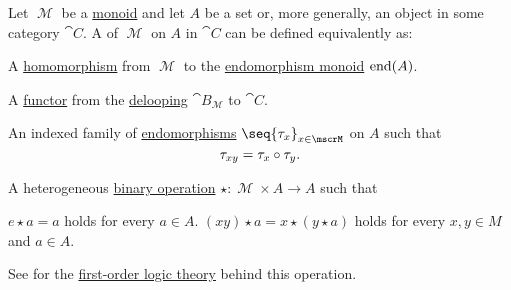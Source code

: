 \begin{definition}\label{def:left_monoid_action}
  Let \( \mscrM \) be a \hyperref[def:unital_magma/monoid]{monoid} and let \( A \) be a set or, more generally, an object in some category \( \cat{C} \). A  of \( \mscrM \) on \( A \) in \( \cat{C} \) can be defined equivalently as:
  \begin{thmenum}
     A \hyperref[def:unital_magma/homomorphism]{homomorphism} from \( \mscrM \) to the \hyperref[def:endomorphism_monoid]{endomorphism monoid} \( \operatorname{end}(A) \).

     A \hyperref[def:functor]{functor} from the \hyperref[def:monoid_delooping]{delooping} \( \cat{B}_\mscrM \) to \( \cat{C} \).

     An indexed family of \hyperref[def:morphism_invertibility/endomorphism]{endomorphisms} \( \seq{ \tau_x }_{x \in \mscrM} \) on \( A \) such that
    \begin{equation}\label{eq:def:left_monoid_action/indirect_homomorphism}
      \tau_{xy} = \tau_x \bincirc \tau_y.
    \end{equation}

     A heterogeneous \hyperref[def:magma]{binary operation} \( \star: \mscrM \times A \to A \) such that
    \begin{thmenum}
       \( e \star a = a \) holds for every \( a \in A \).
       \( (xy) \star a = x \star (y \star a) \) holds for every \( x, y \in M \) and \( a \in A \).
    \end{thmenum}

    See  for the \hyperref[def:first_order_theory]{first-order logic theory} behind this operation.
  \end{thmenum}
\end{definition}
